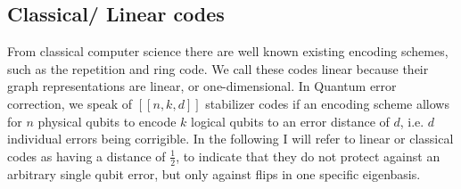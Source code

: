 


\subsection{Classical/ Linear codes}
From classical computer science there are well known existing
encoding schemes, such as the repetition and ring code.
We call these codes linear because their graph representations are
linear, or one-dimensional. In Quantum error correction, we speak of $[[n,k,d]]$ stabilizer
codes if an encoding scheme allows for $n$ physical qubits to 
encode $k$ logical qubits to an error distance of $d$, i.e. $d$ individual errors 
being corrigible.
In the following I will refer to linear or classical codes as having a 
distance of $\frac{1}{2}$, to indicate that they do not protect against an
arbitrary single qubit error, but only against flips in one specific eigenbasis.


\newpage

\newpage

